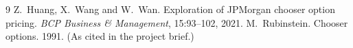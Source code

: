 \documentclass[11pt]{article}
\begin{document}
\begin{thebibliography}{9}\small
{} Z.~Huang, X.~Wang and W.~Wan. Exploration of JPMorgan chooser option pricing.
  \emph{BCP Business \& Management}, 15:93--102, 2021.
 M.~Rubinstein. Chooser options. 1991. (As cited in the project brief.)
\end{thebibliography}
\end{document}
